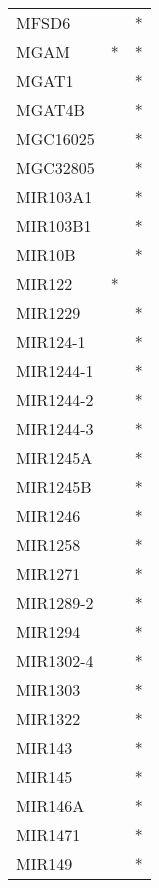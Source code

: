 \begin{longtable}{lcc}
MFSD6           &                &          * \\
MGAM            &              * &          * \\
MGAT1           &                &          * \\
MGAT4B          &                &          * \\
MGC16025        &                &          * \\
MGC32805        &                &          * \\
MIR103A1        &                &          * \\
MIR103B1        &                &          * \\
MIR10B          &                &          * \\
MIR122          &              * &            \\
MIR1229         &                &          * \\
MIR124-1        &                &          * \\
MIR1244-1       &                &          * \\
MIR1244-2       &                &          * \\
MIR1244-3       &                &          * \\
MIR1245A        &                &          * \\
MIR1245B        &                &          * \\
MIR1246         &                &          * \\
MIR1258         &                &          * \\
MIR1271         &                &          * \\
MIR1289-2       &                &          * \\
MIR1294         &                &          * \\
MIR1302-4       &                &          * \\
MIR1303         &                &          * \\
MIR1322         &                &          * \\
MIR143          &                &          * \\
MIR145          &                &          * \\
MIR146A         &                &          * \\
MIR1471         &                &          * \\
MIR149          &                &          * \\

\end{longtable}

